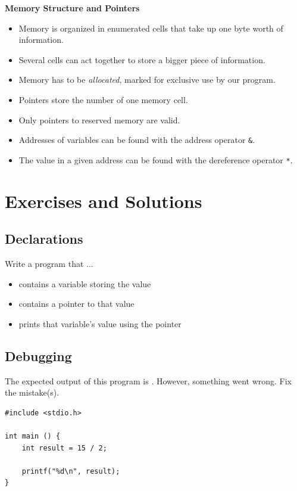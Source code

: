 {{{{\begin{defbox}
\textbf{Memory Structure and Pointers}
\begin{itemize}
\item Memory is organized in enumerated cells that take up one byte worth of information.
\item Several cells can act together to store a bigger piece of information.
\item Memory has to be \emph{allocated}, \ie marked for exclusive use by our program.
\item Pointers store the number of one memory cell.
\item Only pointers to reserved memory are valid.
\item Addresses of variables can be found with the address operator \texttt{\&}.
\item The value in a given address can be found with the dereference operator \texttt{*}.
\end{itemize}
\end{defbox}


\newpage
\section{Exercises and Solutions}
\subsection*{Declarations}
Write a program that ...
\begin{itemize}
\setlength{\itemsep}{0pt}
\item contains a variable storing the value 
\item contains a pointer to that value
\item prints that variable's value using the pointer
\end{itemize}

\subsection*{Debugging}
The expected output of this program is . However, something went wrong. Fix the mistake(s).
\begin{codebox}[exo3-2.c]
\begin{verbatim}
#include <stdio.h>

int main () {
    int result = 15 / 2;
   
    printf("%d\n", result);
}
\end{verbatim}
\end{codebox}

}}}}
